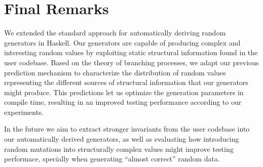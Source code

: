 \section{Final Remarks}

We extended the standard approach for automatically deriving random generators
in Haskell.
%
Our generators are capable of producing complex and interesting random values by
exploiting static structural information found in the user codebase.
%
Based on the theory of branching processes, we adapt our previous prediction
mechanism to characterize the distribution of random values representing the
different sources of structural information that our generators might produce.
%
This predictions let us optimize the generation parameters in compile time,
resulting in an improved testing performance according to our experiments.

In the future we aim to extract stronger invariants from the user codebase into
our automatically derived generators, as well as evaluating how introducing
random mutations into structurally complex values might improve testing
performace, specially when generating ``almost correct'' random data.

